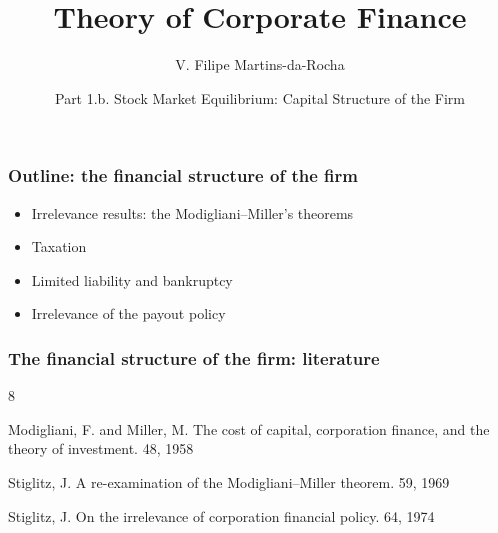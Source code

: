 \documentclass[blue]{beamer}
\title[Corporate Finance]{Theory of Corporate Finance}
\author[Victor Filipe]{V. Filipe Martins-da-Rocha}
\institute[FGV EESP]{Escola de Economia de S\~ao Paulo}
\date[April-June, 2026]{Part 1.b. Stock Market Equilibrium: Capital Structure of the Firm}
\theoremstyle{definition}
\theoremstyle{example}
\begin{document}
\frame{\titlepage}


\begin{frame}\frametitle{Outline: the financial structure of the firm}
    \begin{itemize}
    \item Irrelevance results: the Modigliani--Miller's theorems
    \item Taxation
    \item Limited liability and bankruptcy
    \item Irrelevance of the payout policy
    \end{itemize}
\end{frame}




\begin{frame}\frametitle{The financial structure of the firm: literature}

\begin{thebibliography}{8}


  \beamertemplatearticlebibitems

    Modigliani, F. and Miller, M.
    \newblock The cost of capital, corporation finance, and the theory of investment.
     48, 1958

    Stiglitz, J.
    \newblock A re-examination of the Modigliani--Miller theorem.
     59, 1969

    Stiglitz, J.
    \newblock On the irrelevance of corporation financial policy.
     64, 1974



    \end{thebibliography}

\end{frame}

\end{document}
